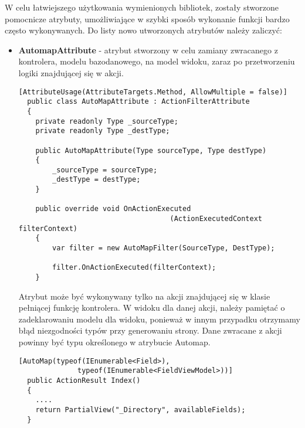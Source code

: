 W celu łatwiejszego użytkowania wymienionych bibliotek, zostały stworzone pomocnicze atrybuty, umożliwiające w szybki sposób wykonanie funkcji bardzo często wykonywanych. Do listy nowo utworzonych atrybutów należy zaliczyć:
\begin{itemize}
  \item \textbf{AutomapAttribute} - atrybut stworzony w celu zamiany zwracanego z kontrolera, modelu bazodanowego, na model widoku, zaraz po przetworzeniu logiki znajdującej się w akcji.
  \\
  \begin{lstlisting}[caption=Kod atrybutu Automap]
  [AttributeUsage(AttributeTargets.Method, AllowMultiple = false)]
  public class AutoMapAttribute : ActionFilterAttribute
  {
  	private readonly Type _sourceType;
  	private readonly Type _destType;
  	
  	public AutoMapAttribute(Type sourceType, Type destType)
  	{
  		_sourceType = sourceType;
  		_destType = destType;
  	}
  	
  	public override void OnActionExecuted
  									(ActionExecutedContext filterContext)
  	{
  		var filter = new AutoMapFilter(SourceType, DestType);
  		
  		filter.OnActionExecuted(filterContext);
  	}
  \end{lstlisting}
  
  Atrybut może być wykonywany tylko na akcji znajdującej się w klasie pełniącej funkcję kontrolera. W widoku dla danej akcji, należy pamiętać o zadeklarowaniu modelu dla widoku, ponieważ w innym przypadku otrzymamy błąd niezgodności typów przy generowaniu strony. Dane zwracane z akcji powinny być typu określonego w atrybucie Automap.
  \\
  \begin{lstlisting}[caption=Wykorzystanie atrybutu AutoMap]
  [AutoMap(typeof(IEnumerable<Field>),
			  typeof(IEnumerable<FieldViewModel>))]
  public ActionResult Index()
  {
  	....
  	return PartialView("_Directory", availableFields);
  }
  \end{lstlisting}
  

\end{itemize}
